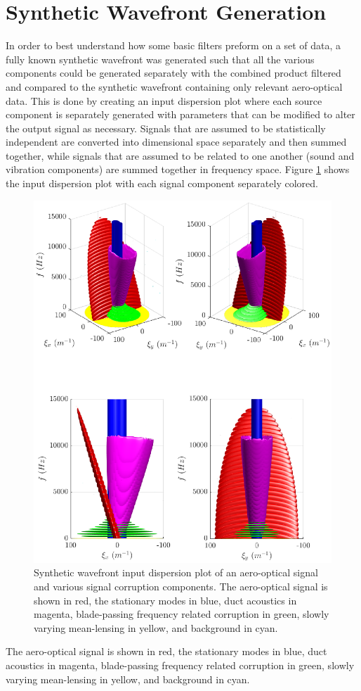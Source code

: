 \section{Synthetic Wavefront Generation}
In order to best understand how some basic filters preform on a set of data, a fully known synthetic wavefront was generated such that all the various components could be generated separately with the combined product filtered and compared to the synthetic wavefront containing only relevant aero-optical data.
This is done by creating an input dispersion plot where each source component is separately generated with parameters that can be modified to alter the output signal as necessary.
Signals that are assumed to be statistically independent are converted into dimensional space separately and then summed together, while signals that are assumed to be related to one another (sound and vibration components) are summed together in frequency space.
Figure \ref{fig:04_synthetic_dispersion_input} shows the input dispersion plot with each signal component separately colored.
\begin{figure}
  \centering
  \includegraphics{../matlab/04_basic_filtering/synthetic_wavefront.eps}
  \caption{Synthetic wavefront input dispersion plot of an aero-optical signal and various signal corruption components.  The aero-optical signal is shown in red, the stationary modes in blue, duct acoustics in magenta, blade-passing frequency related corruption in green, slowly varying mean-lensing in yellow, and background in cyan.}
  \label{fig:04_synthetic_dispersion_input}
\end{figure}
The aero-optical signal is shown in red, the stationary modes in blue, duct acoustics in magenta, blade-passing frequency related corruption in green, slowly varying mean-lensing in yellow, and background in cyan.

